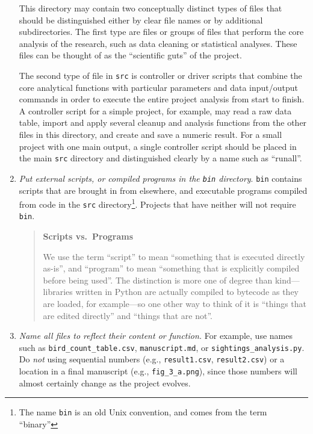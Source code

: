 \documentclass[10pt]{article}
\newcommand{\recommend}[1]{\textit{#1}}
\begin{document}
\begin{enumerate}
    This directory may contain two conceptually distinct types
    of files that should be distinguished either by clear file names or by
    additional subdirectories. The first type are files or
    groups of files that perform the core
    analysis of the research, such as data cleaning or statistical analyses.
    These files can be thought of as the
    ``scientific guts'' of the project.

    The second type of file in \texttt{src} is controller or driver
    scripts that combine the core analytical functions with particular
    parameters and data input/output commands in order to execute the
    entire project analysis from start to finish. A controller script for
    a simple project, for example, may read a raw data table, import and
    apply several cleanup and analysis functions from the other files in
    this directory, and create and save a numeric result. For a small
    project with one main output, a single controller script should be
    placed in the main \texttt{src} directory and distinguished clearly by
    a name such as ``runall''.

\item
  \recommend{Put external scripts, or compiled programs
   in the \texttt{bin} directory}.  \texttt{bin} contains
  scripts that are brought in from elsewhere, and executable programs
  compiled from code in the \texttt{src} directory\footnote{The name
    \texttt{bin} is an old Unix convention, and comes from the term
    ``binary''}. Projects that have neither will not require \texttt{bin}.

  \begin{quote}
    \noindent \textbf{Scripts vs.\ Programs}

    We use the term ``script'' to mean ``something that is executed
    directly as-is'', and ``program'' to mean ``something that is
    explicitly compiled before being used''.  The distinction is more
    one of degree than kind---libraries written in Python are actually
    compiled to bytecode as they are loaded, for example---so one
    other way to think of it is ``things that are edited directly''
    and ``things that are not''.
  \end{quote}

\item
  \recommend{Name all files to reflect their content or function.} For
  example, use names such as \texttt{bird\_count\_table.csv},
  \texttt{manuscript.md}, or \texttt{sightings\_analysis.py}.  Do
  \emph{not} using sequential numbers (e.g., \texttt{result1.csv},
  \texttt{result2.csv}) or a location in a final manuscript (e.g.,
  \texttt{fig\_3\_a.png}), since those numbers will almost certainly
  change as the project evolves.

\end{enumerate}
\end{document}
